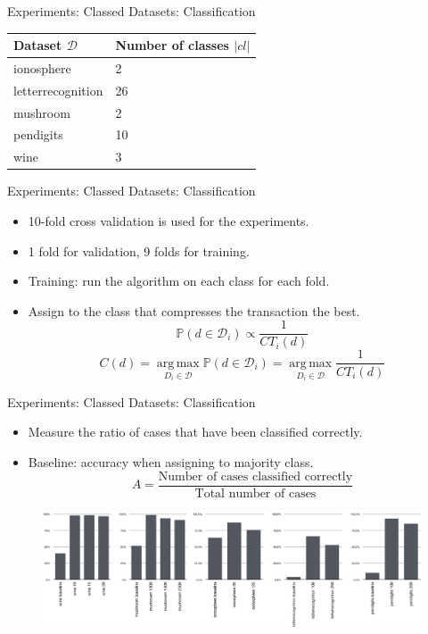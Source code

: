 \documentclass{beamer}
\DeclareMathOperator*{\argmax}{arg\,max}
\newcommand{\codetable}{CT}
\newcommand{\dataset}{\mathcal{D}}
\newcommand{\prob}{\mathbb{P}}
\begin{document}
\begin{frame}{Experiments: Classed Datasets: Classification}
\begin{table}[H]
\centering
\begin{tabular}{l|l}
Dataset $\dataset$ & Number of classes $|cl|$ \\ \hline
ionosphere         & 2                        \\
letterrecognition  & 26                       \\
mushroom           & 2                        \\
pendigits          & 10                       \\
wine               & 3                       
\end{tabular}
\end{table}
\end{frame}

\begin{frame}{Experiments: Classed Datasets: Classification}
\begin{itemize}
	\item 10-fold cross validation is used for the experiments.
	\item 1 fold for validation, 9 folds for training.
	\item Training: run the algorithm on each class for each fold.
	\item Assign to the class that compresses the transaction the best.
	\[
\prob(d \in \dataset_i) \propto \frac{1}{\codetable_i(d)}
\]
	\[{C(d) = \argmax\limits_{D_i \in \dataset} \prob(d \in \dataset_i) = \argmax\limits_{D_i \in \dataset} \frac{1}{\codetable_i(d)}}\]
\end{itemize}

\end{frame}

\begin{frame}{Experiments: Classed Datasets: Classification}
	\begin{itemize}
		\item Measure the ratio of cases that have been classified correctly.
		\item Baseline: accuracy when assigning to majority class.
		\[A = \frac{\text{Number of cases classified correctly}}{\text{Total number of cases}}\]
	\end{itemize}
\begin{figure}
  \centering
  \includegraphics[width=\textwidth]{img/class-all}
\end{figure}
\end{frame}
\end{document}
